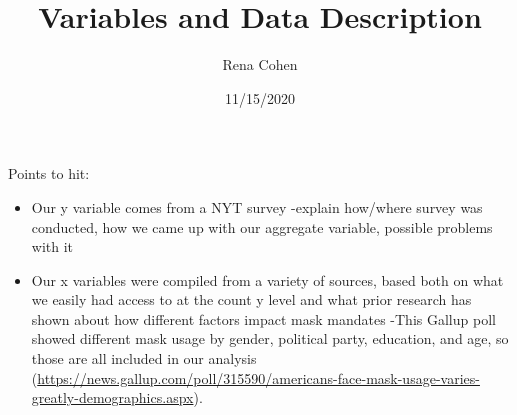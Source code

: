 \documentclass[
]{article}
\title{Variables and Data Description}
\author{Rena Cohen}
\date{11/15/2020}
\begin{document}
\maketitle

Points to hit:

\begin{itemize}
\item
  Our y variable comes from a NYT survey -explain how/where survey was
  conducted, how we came up with our aggregate variable, possible
  problems with it
\item
  Our x variables were compiled from a variety of sources, based both on
  what we easily had access to at the count y level and what prior
  research has shown about how different factors impact mask mandates
  -This Gallup poll showed different mask usage by gender, political
  party, education, and age, so those are all included in our analysis
  (\url{https://news.gallup.com/poll/315590/americans-face-mask-usage-varies-greatly-demographics.aspx}).
\end{itemize}
\end{document}
